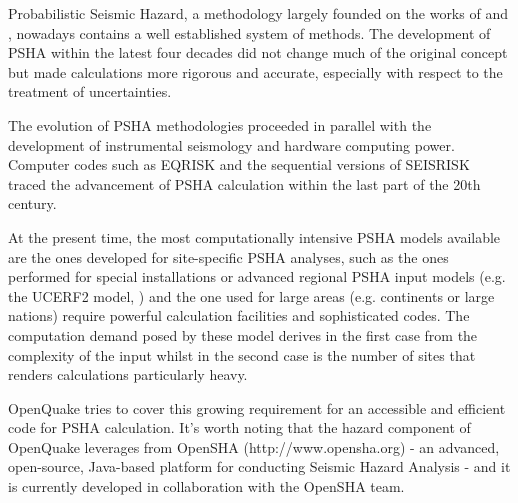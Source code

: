Probabilistic Seismic Hazard, a methodology largely 
founded on the works of \citet{cornell1968} and \citet{esteva1968}, 
nowadays contains a well established system of methods. 
%
The development of PSHA within the latest four decades did not change much of 
the original concept but made calculations more rigorous and accurate, 
especially with respect to the treatment of uncertainties. 

The evolution of PSHA methodologies proceeded in parallel with the development 
of instrumental seismology and hardware computing power. Computer codes such as
EQRISK \citep{mcguire1976} and the sequential versions of SEISRISK
\citep{bender1982,bender1987} traced the advancement of PSHA calculation within
the last part of the 20th century.

At the present time, the most computationally intensive PSHA models available 
are the ones developed for site-specific PSHA analyses, such as the ones 
performed for special installations or advanced regional PSHA input models 
(e.g. the UCERF2 model, \citet{field2009}) and the one used for large areas 
(e.g. continents or large nations) require powerful calculation facilities 
and sophisticated codes.
%
The computation demand posed by these model derives in the first case from 
the complexity of the input whilst in the second case is the number of sites 
that renders calculations particularly heavy.  

OpenQuake tries to cover this growing requirement for an accessible and 
efficient code for PSHA calculation. It's worth noting that the hazard 
component of OpenQuake leverages from OpenSHA (http://www.opensha.org) - 
an advanced, open-source, Java-based platform for conducting Seismic 
Hazard Analysis - and it is currently developed in collaboration with 
the OpenSHA team.  
%
